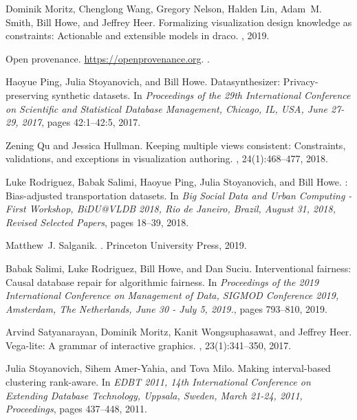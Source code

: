 Dominik Moritz, Chenglong Wang, Gregory Nelson, Halden Lin, Adam~M. Smith, Bill
  Howe, and Jeffrey Heer.
\newblock Formalizing visualization design knowledge as constraints: Actionable
  and extensible models in draco.
,
  2019.

Open provenance.
\newblock \url{https://openprovenance.org}.
.

Haoyue Ping, Julia Stoyanovich, and Bill Howe.
\newblock Datasynthesizer: Privacy-preserving synthetic datasets.
\newblock In {\em Proceedings of the 29th International Conference on
  Scientific and Statistical Database Management, Chicago, IL, USA, June 27-29,
  2017}, pages 42:1--42:5, 2017.

Zening Qu and Jessica Hullman.
\newblock Keeping multiple views consistent: Constraints, validations, and
  exceptions in visualization authoring.
, 24(1):468--477, 2018.

Luke Rodriguez, Babak Salimi, Haoyue Ping, Julia Stoyanovich, and Bill Howe.
: Bias-adjusted transportation datasets.
\newblock In {\em Big Social Data and Urban Computing - First Workshop,
  BiDU@VLDB 2018, Rio de Janeiro, Brazil, August 31, 2018, Revised Selected
  Papers}, pages 18--39, 2018.

Matthew~J. Salganik.
.
\newblock Princeton University Press, 2019.

Babak Salimi, Luke Rodriguez, Bill Howe, and Dan Suciu.
\newblock Interventional fairness: Causal database repair for algorithmic
  fairness.
\newblock In {\em Proceedings of the 2019 International Conference on
  Management of Data, {SIGMOD} Conference 2019, Amsterdam, The Netherlands,
  June 30 - July 5, 2019.}, pages 793--810, 2019.

Arvind Satyanarayan, Dominik Moritz, Kanit Wongsuphasawat, and Jeffrey Heer.
\newblock Vega-lite: {A} grammar of interactive graphics.
, 23(1):341--350, 2017.

Julia Stoyanovich, Sihem Amer{-}Yahia, and Tova Milo.
\newblock Making interval-based clustering rank-aware.
\newblock In {\em {EDBT} 2011, 14th International Conference on Extending
  Database Technology, Uppsala, Sweden, March 21-24, 2011, Proceedings}, pages
  437--448, 2011.

